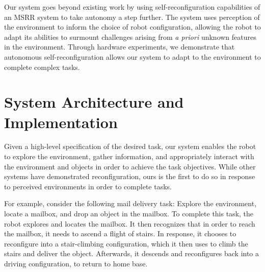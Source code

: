 \documentclass[journal]{IEEEtran}
\begin{document}
Our system goes beyond existing work by using self-reconfiguration capabilities of an MSRR system to take autonomy a step further.  The system uses perception of the environment to inform the choice of robot configuration, allowing the robot to adapt its abilities to surmount challenges arising from \textit{a priori} unknown features in the environment. Through hardware experiments, we demonstrate that autonomous self-reconfiguration allows our system to adapt to the environment to complete complex tasks.

\section{System Architecture and Implementation}\label{sec:system}
%
Given a high-level specification of the desired task, our system enables the robot to explore the environment, gather information, and appropriately interact with the environment and objects in order to achieve the task objectives.
While other systems have demonstrated reconfiguration, ours is the first to do so in response to perceived environments in order to complete tasks.

For example, consider the following mail delivery task: Explore the environment, locate a mailbox, and drop an object in the mailbox.  To complete this task, the robot explores and locates the mailbox. It then recognizes that in order to reach the mailbox, it needs to ascend a flight of stairs. In response, it chooses to reconfigure into a stair-climbing configuration, which it then uses to climb the stairs and deliver the object.  Afterwards, it descends and reconfigures back into a driving configuration, to return to home base.
\end{document}
